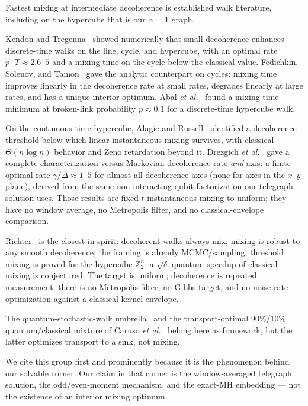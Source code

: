 \documentclass[aps,prx,reprint,floatfix,amsmath,amssymb,amsfonts]{revtex4-2}
\begin{document}
Fastest mixing at intermediate decoherence is established walk
literature, including on the hypercube that is our $\alpha=1$ graph.

Kendon and Tregenna~\cite{KendonTregenna2003} showed numerically that
small decoherence enhances discrete-time walks on the line, cycle, and
hypercube, with an optimal rate $p\cdot T \approx 2.6$--$5$ and a mixing
time on the cycle below the classical value. Fedichkin, Solenov, and
Tamon~\cite{Fedichkin2006} gave the analytic counterpart on cycles:
mixing time improves linearly in the decoherence rate at small rates,
degrades linearly at large rates, and has a unique interior optimum.
Abal \emph{et al.}~\cite{Abal2007} found a mixing-time minimum at
broken-link probability $p\approx 0.1$ for a discrete-time hypercube
walk.

On the continuous-time hypercube, Alagic and
Russell~\cite{AlagicRussell2005} identified a decoherence threshold
below which linear instantaneous mixing survives, with classical
$\Theta(n\log n)$ behavior and Zeno retardation beyond it. Drezgich
\emph{et al.}~\cite{Drezgich2009} gave a complete characterization
versus Markovian decoherence rate \emph{and} axis: a finite optimal rate
$\gamma/\Delta \approx 1$--$5$ for almost all decoherence axes (none for
axes in the $x$--$y$ plane), derived from the same
non-interacting-qubit factorization our telegraph solution uses. Those
results are fixed-$t$ instantaneous mixing to uniform; they have no
window average, no Metropolis filter, and no classical-envelope
comparison.

Richter~\cite{Richter2007pra,Richter2007njp} is the closest in spirit:
decoherent walks always mix; mixing is robust to any smooth decoherence;
the framing is already MCMC/sampling; threshold mixing is proved for the
hypercube $\mathbb{Z}_2^n$; a $\sqrt{\delta}$ quantum speedup of
classical mixing is conjectured. The target is uniform; decoherence is
repeated measurement; there is no Metropolis filter, no Gibbs target,
and no noise-rate optimization against a classical-kernel envelope.

The quantum-stochastic-walk umbrella~\cite{Whitfield2010} and the
transport-optimal $90\%$/$10\%$ quantum/classical mixture of Caruso
\emph{et al.}~\cite{Caruso2014} belong here as framework, but the latter
optimizes transport to a sink, not mixing.

We cite this group first and prominently because it is the phenomenon
behind our solvable corner. Our claim in that corner is the
window-averaged telegraph solution, the odd/even-moment mechanism, and
the exact-MH embedding --- not the existence of an interior mixing
optimum.
\end{document}
